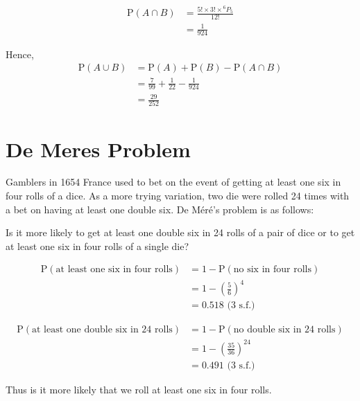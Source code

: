 \documentclass[11pt,a4paper]{book}
\begin{document}
\begin{example}
\begin{enumerate}[label=(\alph*)]
\begin{align*}
\text{P}\left(A\cap B\right) & =\frac{5!\times3!\times{}^{6}P_{5}}{12!}\\
 & =\frac{1}{924}
\end{align*}

Hence,
\begin{align*}
\text{P}\left(A\cup B\right) & =\text{P}\left(A\right)+\text{P}\left(B\right)-\text{P}\left(A\cap B\right)\\
 & =\frac{7}{99}+\frac{1}{22}-\frac{1}{924}\\
 & =\frac{29}{252}
\end{align*}

\end{enumerate}
\end{example}

\newpage{}

\section{De Meres Problem}

Gamblers in 1654 France used to bet on the event of getting at least
one six in four rolls of a dice. As a more trying variation, two die
were rolled 24 times with a bet on having at least one double six.
De Méré's problem is as follows:

\begin{example}

Is it more likely to get at least one double six in 24 rolls
of a pair of dice or to get at least one six in four rolls
of a single die?

\Solution

\begin{align*}
\text{P}\left(\text{at least one six in four rolls}\right) & =1-\text{P}\left(\text{no six in four rolls}\right)\\
 & =1-\left(\frac{5}{6}\right)^{4}\\
 & =0.518\text{ (3 s.f.)}
\end{align*}

\begin{align*}
\text{P}\left(\text{at least one double six in 24 rolls}\right) & =1-\text{P}\left(\text{no double six in 24 rolls}\right)\\
 & =1-\left(\frac{35}{36}\right)^{24}\\
 & =0.491\text{ (3 s.f.)}
\end{align*}

Thus is it more likely that we roll at least one six in four rolls.

\end{example}
\end{document}
